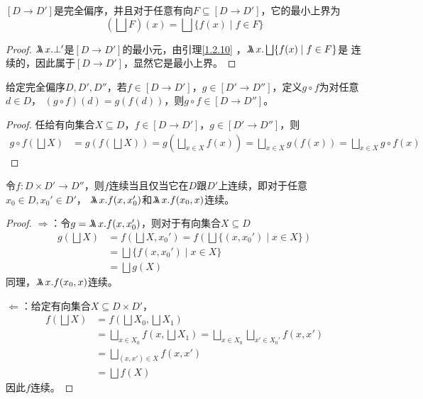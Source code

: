 \documentclass[11pt]{article}
\begin{document}
\begin{proposition}[]
\label{1.2.11}
\([D\to D']\)是完全偏序，并且对于任意有向\(F\subseteq[D\to D']\)，它的最小上界为
\begin{equation*}
(\bigsqcup F)(x)=\bigsqcup\{f(x)\mid f\in F\}
\end{equation*}
\end{proposition}

\begin{proof}
\(\metalambda x.\bot'\)是\([D\to D']\)的最小元，由引理\ref{1.2.10} ，\(\metalambda x.\bigsqcup\{f(x)\mid f\in F\}\)是
连续的，因此属于\([D\to D']\)，显然它是最小上界。
\end{proof}

\begin{proposition}[]
给定完全偏序\(D,D',D''\)，若\(f\in[D\to D']\)，\(g\in[D'\to D'']\)，定义\(g\circ f\)为对任意\(d\in D\)，
\((g\circ f)(d)=g(f(d))\)，则\(g\circ f\in[D\to D'']\)。
\end{proposition}

\begin{proof}
任给有向集合\(X\subseteq D\)，\(f\in[D\to D']\)，\(g\in[D'\to D'']\)，则
\begin{align*}
g\circ f(\bigsqcup X)&=g(f(\bigsqcup X))=g(\bigsqcup_{x\in X} f(x))=\bigsqcup_{x\in X}g(f(x))=\bigsqcup_{x\in X} g\circ f(x)
\end{align*}
\end{proof}


\begin{lemma}[]
\label{1.2.12}
令\(f:D\times D'\to D''\)，则\(f\)连续当且仅当它在\(D\)跟\(D'\)上连续，即对于任意\(x_0\in D,x_0'\in D'\)，
\(\metalambda x.f(x,x_0')\)和\(\metalambda x.f(x_0,x)\)连续。
\end{lemma}

\begin{proof}
\(\Rightarrow\)：令\(g=\metalambda x.f(x,x_0')\)，则对于有向集合\(X\subseteq D\)
\begin{align*}
g(\bigsqcup X)&=f(\bigsqcup X,x_0')=f(\bigsqcup\{(x,x_0')\mid x\in X\})\\
&=\bigsqcup\{f(x,x_0')\mid x\in X\}\\
&=\bigsqcup g(X)
\end{align*}
同理，\(\metalambda x.f(x_0,x)\)连续。

\(\Leftarrow\)：给定有向集合\(X\subseteq D\times D'\)，
\begin{align*}
f(\bigsqcup X)&=f(\bigsqcup X_0,\bigsqcup X_1)\\
&=\bigsqcup_{x\in X_0}f(x,\bigsqcup X_1)=\bigsqcup_{x\in X_0}\bigsqcup_{x'\in X_0'}f(x,x')\\
&=\bigsqcup_{(x,x')\in X}f(x,x')\\
&=\bigsqcup f(X)
\end{align*}
因此\(f\)连续。
\end{proof}
\end{document}

